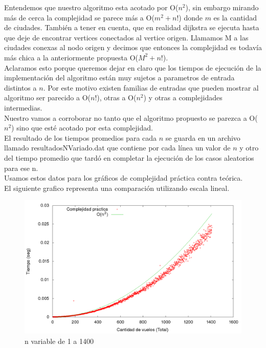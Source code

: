 \noindent 
Entendemos que nuestro algoritmo esta acotado por O($n^2$), sin embargo mirando m\'as de cerca la complejidad se parece m\'as a O($m^2+n!$) donde $m$ es la cantidad de ciudades. Tambi\'en a tener en cuenta, que en realidad dijkstra se ejecuta hasta que deje de encontrar vertices conectados al vertice origen. Llamamos M a las ciudades conexas al nodo origen y decimos que entonces la complejidad es todav\'ia m\'as chica a la anteriormente propuesta O($M^2+n!$). \\
Aclaramos esto porque queremos dejar en claro que los tiempos de ejecuci\'on de la implementaci\'on del algoritmo est\'an muy sujetos a parametros de entrada distintos a $n$. Por este motivo existen familias de entradas que pueden mostrar al algoritmo ser parecido a O($n!$), otras a O($n^2$) y otras a complejidades intermedias. \\

\noindent 
Nuestro vamos a corroborar no tanto que el algoritmo propuesto se parezca a O($n^2$) sino que est\'e acotado por esta complejidad. \\

\noindent 
El resultado de los tiempos promedios para cada $n$ se guarda en un archivo llamado resultadosNVariado.dat que contiene por cada l\'inea un valor de $n$ y otro del tiempo promedio que tard\'o en completar la ejecuci\'on de los casos aleatorios para ese n. \\

\noindent 
Usamos estos datos para los gr\'aficos de complejidad pr\'actica contra te\'orica.  \\
El siguiente grafico representa una comparación utilizando escala lineal. \\

\begin{figure}[H]
\begin{center}
\includegraphics[scale=0.35]{./imagenes/ej1_chartComplejidad.png}
\caption{n variable de 1 a 1400}
\end{center}
\end{figure}

